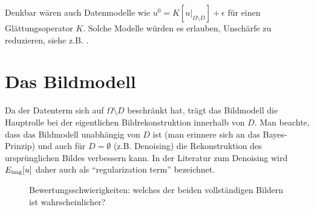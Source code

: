 \documentclass{mythesis}
\begin{document}
Denkbar wären auch Datenmodelle wie $u^0 = K[u|_{\Omega\setminus D}] + \epsilon$ für einen Glättungsoperator $K$.
Solche Modelle würden es erlauben, Unschärfe zu reduzieren, siehe z.B. \cite{rudin1994total}.


\section{Das Bildmodell}

Da der Datenterm sich auf $\Omega \setminus D$ beschränkt hat, trägt das Bildmodell die Hauptrolle bei der eigentlichen Bildrekonstruktion innerhalb von $D$.
Man beachte, dass das Bildmodell unabhängig von $D$ ist (man erinnere sich an das Bayes-Prinzip) und auch für $D = \emptyset$ (z.B. Denoising) die Rekonstruktion des ursprünglichen Bildes verbessern kann.
In der Literatur zum Denoising wird $E_{\mathrm{img}}[u]$ daher auch als “regularization term” bezeichnet.

\begin{figure}[ht]
    \begin{subfigure}[b]{0.33\textwidth}
	\centering
    \end{subfigure}%
    \begin{subfigure}[b]{0.33\textwidth}
	\centering
    \end{subfigure}%
    \begin{subfigure}[b]{0.33\textwidth}
	\centering
    \end{subfigure}
    \caption{Bewertungsschwierigkeiten: welches der beiden vollständigen Bildern ist wahrscheinlicher?}
    \label{fig:inpainting_non_unique}
\end{figure}
\end{document}
